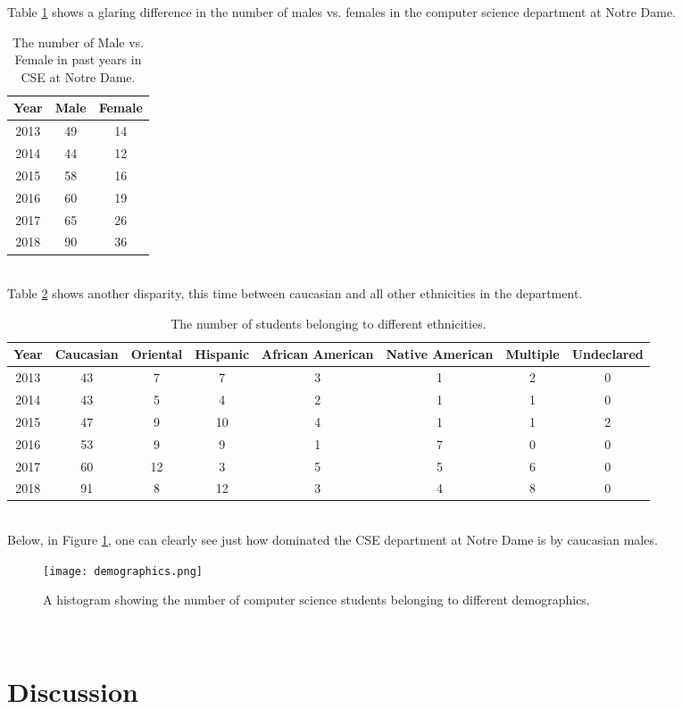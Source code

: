 \documentclass{article}
\begin{document}
Table \ref{tab:Table1} shows a glaring difference in the number of males vs.
females in the computer science department at Notre Dame.
\\
\begin{table}[h!]
\centering
\begin{tabular}{c|c|c}
Year & Male & Female\\
\hline
2013&49&14\\
2014&44&12\\
2015&58&16\\
2016&60&19\\
2017&65&26\\
2018&90&36\\
\end{tabular}
\caption{The number of Male vs. Female in past years in CSE at Notre Dame.}
\label{tab:Table1}
\end{table}
\\
Table \ref{tab:Table2} shows another disparity, this time between caucasian and all
other ethnicities in the department.
\\
\begin{table}[h!]
\centering
\begin{tabular}{c|c|c|c|c|c|c|c}
Year & Caucasian & Oriental & Hispanic & African American & Native American & Multiple & Undeclared\\
\hline
2013&43&7&7&3&1&2&0\\
2014&43&5&4&2&1&1&0\\
2015&47&9&10&4&1&1&2\\
2016&53&9&9&1&7&0&0\\
2017&60&12&3&5&5&6&0\\
2018&91&8&12&3&4&8&0\\
\end{tabular}
\caption{The number of students belonging to different ethnicities.}
\label{tab:Table2}
\end{table}
\\
Below, in Figure \ref{fig:Demographics}, one can clearly see just how dominated 
the CSE department at Notre Dame is by caucasian males.
\\
\begin{figure}[h!]
\texttt{[image: demographics.png]}
\caption{A histogram showing the number of computer science students belonging to different demographics.}
\label{fig:Demographics}
\end{figure}
\\
\section*{Discussion}
\end{document}

